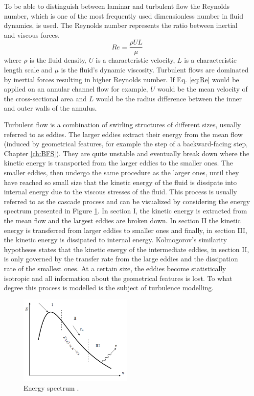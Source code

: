 To be able to distinguish between laminar and turbulent flow the Reynolds number, which is one of the most frequently used dimensionless number in fluid dynamics, is used. The Reynolds number represents the ratio between inertial and viscous forces.
\begin{equation}
  Re = \frac{\rho U L}{\mu}
  \label{eq:Re}
\end{equation}
where $\rho$ is the fluid density, $U$ is a characteristic velocity, $L$ is a characteristic length scale and $\mu$ is the fluid's dynamic viscosity. Turbulent flows are dominated by inertial forces resulting in higher Reynolds number. If Eq. \ref{eq:Re} would be applied on an annular channel flow for example, $U$ would be the mean velocity of the cross-sectional area and $L$ would be the radius difference between the inner and outer walls of the annulus. 

Turbulent flow is a combination of swirling structures of different sizes, usually referred to as eddies. The larger eddies extract their energy from the mean flow (induced by geometrical features, for example the step of a backward-facing step, Chapter \ref{ch:BFS}). They are quite unstable and eventually break down where the kinetic energy is transported from the larger eddies to the smaller ones. The smaller eddies, then undergo the same procedure as the larger ones, until they have reached so small size that the kinetic energy of the fluid is dissipate into internal energy due to the viscous stresses of the fluid. This process is usually referred to as the cascade process \cite{Cascade} and can be visualized by considering the energy spectrum presented in Figure \ref{fig:cascade}. In section I, the kinetic energy is extracted from the mean flow and the largest eddies are broken down. In section II the kinetic energy is transferred from larger eddies to smaller ones and finally, in section III, the kinetic energy is dissipated to internal energy. Kolmogorov's similarity hypotheses \cite{Cascade} states that the kinetic energy of the intermediate eddies, in section II, is only governed by the transfer rate from the large eddies and the dissipation rate of the smallest ones. At a certain size, the eddies become statistically isotropic and all information about the geometrical features is lost. To what degree this process is modelled is the subject of turbulence modelling.
\begin{figure}[h]
  \centering
  \includegraphics[width=0.5\textwidth]{figures/EnergySpectrum.png}
  \caption{Energy spectrum \cite{Lada}.}\label{fig:cascade}
\end{figure}

